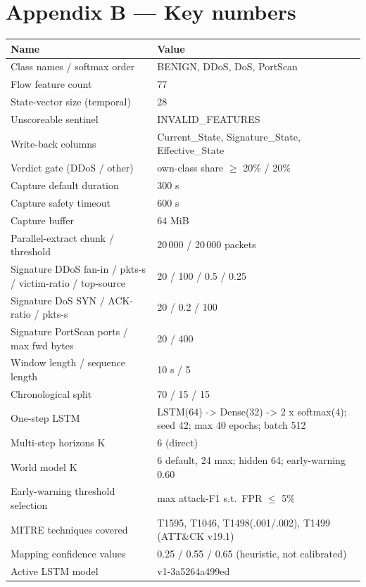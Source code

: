 \documentclass[11pt,a4paper]{article}
\begin{document}
\section*{Appendix B --- Key numbers}
\begin{longtable}{@{}p{7cm}p{7cm}@{}}
\toprule \textbf{Name} & \textbf{Value} \\ \midrule \endhead \bottomrule \endfoot
Class names / softmax order & BENIGN, DDoS, DoS, PortScan \\
Flow feature count & 77 \\
State-vector size (temporal) & 28 \\
Unscoreable sentinel & INVALID\_FEATURES \\
Write-back columns & Current\_State, Signature\_State, Effective\_State \\
Verdict gate (DDoS / other) & own-class share $\geq$ 20\% / 20\% \\
Capture default duration & 300 s \\
Capture safety timeout & 600 s \\
Capture buffer & 64 MiB \\
Parallel-extract chunk / threshold & 20\,000 / 20\,000 packets \\
Signature DDoS fan-in / pkts-s / victim-ratio / top-source & 20 / 100 / 0.5 / 0.25 \\
Signature DoS SYN / ACK-ratio / pkts-s & 20 / 0.2 / 100 \\
Signature PortScan ports / max fwd bytes & 20 / 400 \\
Window length / sequence length & 10 s / 5 \\
Chronological split & 70 / 15 / 15 \\
One-step LSTM & LSTM(64) -> Dense(32) -> 2 x softmax(4); seed 42; max 40 epochs; batch 512 \\
Multi-step horizons K & 6 (direct) \\
World model K & 6 default, 24 max; hidden 64; early-warning 0.60 \\
Early-warning threshold selection & max attack-F1 s.t.\ FPR $\leq$ 5\% \\
MITRE techniques covered & T1595, T1046, T1498(.001/.002), T1499 (ATT\&CK v19.1) \\
Mapping confidence values & 0.25 / 0.55 / 0.65 (heuristic, not calibrated) \\
Active LSTM model & v1-3a5264a499ed \\
\end{longtable}
\end{document}
